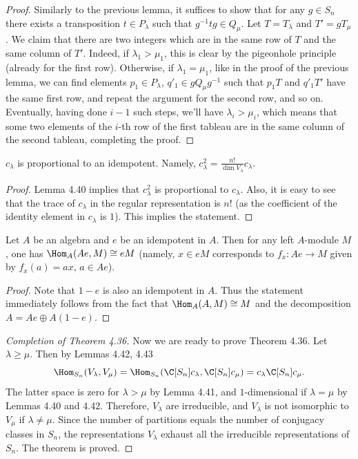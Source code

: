 \begin{proof}
Similarly to the previous lemma, it suffices to show that for any $g\in S_n$ there exists a transposition $t\in P_\lambda$ such that $g^{-1}tg\in Q_\mu$. Let $T=T_\lambda$ and $T'=gT_\mu$. We claim that there are two integers which are in the same row of $T$ and the same column of $T'$. Indeed, if $\lambda_1>\mu_1$, this is clear by the pigeonhole principle (already for the first row). Otherwise, if $\lambda_1=\mu_1$, like in the proof of the previous lemma, we can find elements $p_1\in P_\lambda$, $q'_1\in gQ_\mu g^{-1}$ such that $p_1T$ and $q'_1T'$ have the same first row, and repeat the argument for the second row, and so on. Eventually, having done $i-1$ such steps, we'll have $\lambda_i>\mu_i$, which means that some two elements of the $i$-th row of the first tableau are in the same column of the second tableau, completing the proof.
\end{proof}
\begin{lemma}[4.42]
$c_\lambda$ is proportional to an idempotent. Namely, $c_\lambda^2=\frac{n!}{\dim V_\lambda}c_\lambda$.
\end{lemma}
\begin{proof}
Lemma 4.40 implies that $c_\lambda^2$ is proportional to $c_\lambda$. Also, it is easy to see that the trace of $c_\lambda$ in the regular representation is $n!$ (as the coefficient of the identity element in $c_\lambda$ is $1$). This implies the statement.
\end{proof}
\begin{lemma}[4.43]
Let $A$ be an algebra and $e$ be an idempotent in $A$. Then for any left $A$-module $M$, one has $\Hom_A(Ae,M)\cong eM$ (namely, $x\in eM$ corresponds to $f_x:Ae\to M$ given by $f_x(a)=ax$, $a\in Ae$).
\end{lemma}
\begin{proof}
Note that $1-e$ is also an idempotent in $A$. Thus the statement immediately follows from the fact that $\Hom_A(A,M)\cong M$ and the decomposition $A=Ae\oplus A(1-e)$.
\end{proof}
\begin{proof}[Completion of Theorem 4.36]
Now we are ready to prove Theorem 4.36. Let $\lambda\geq\mu$. Then by Lemmas 4.42, 4.43
\[
\Hom_{S_n}(V_\lambda,V_\mu)
=\Hom_{S_n}(\C[S_n]c_\lambda,\C[S_n]c_\mu)
=c_\lambda\C[S_n]c_\mu.
\]
The latter space is zero for $\lambda>\mu$ by Lemma 4.41, and $1$-dimensional if $\lambda=\mu$ by Lemmas 4.40 and 4.42. Therefore, $V_\lambda$ are irreducible, and $V_\lambda$ is not isomorphic to $V_\mu$ if $\lambda\ne\mu$. Since the number of partitions equals the number of conjugacy classes in $S_n$, the representations $V_\lambda$ exhaust all the irreducible representations of $S_n$. The theorem is proved.
\end{proof}
